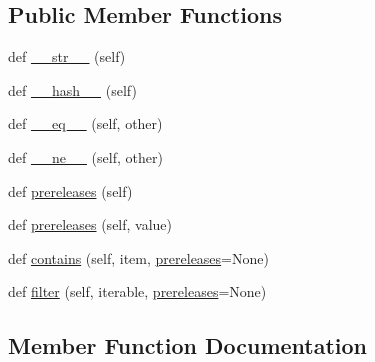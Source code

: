\subsection*{Public Member Functions}
\begin{DoxyCompactItemize}
\item 
def \hyperlink{classpkg__resources_1_1__vendor_1_1packaging_1_1specifiers_1_1_base_specifier_ad31c14d890ebbbe66fc06e8d21a24d7a}{\+\_\+\+\_\+str\+\_\+\+\_\+} (self)
\item 
def \hyperlink{classpkg__resources_1_1__vendor_1_1packaging_1_1specifiers_1_1_base_specifier_a52dc1cdce2579dda1edf9b1dde877dd0}{\+\_\+\+\_\+hash\+\_\+\+\_\+} (self)
\item 
def \hyperlink{classpkg__resources_1_1__vendor_1_1packaging_1_1specifiers_1_1_base_specifier_a03c94e7e4a4797fcb5af5a852148b128}{\+\_\+\+\_\+eq\+\_\+\+\_\+} (self, other)
\item 
def \hyperlink{classpkg__resources_1_1__vendor_1_1packaging_1_1specifiers_1_1_base_specifier_a05e2c54c1ffe67581bfed5b7b6ad42d1}{\+\_\+\+\_\+ne\+\_\+\+\_\+} (self, other)
\item 
def \hyperlink{classpkg__resources_1_1__vendor_1_1packaging_1_1specifiers_1_1_base_specifier_aa1a1ef2c6e47899e91494fde9b495162}{prereleases} (self)
\item 
def \hyperlink{classpkg__resources_1_1__vendor_1_1packaging_1_1specifiers_1_1_base_specifier_a897a6a62cda3786551aab9e0b62f7da3}{prereleases} (self, value)
\item 
def \hyperlink{classpkg__resources_1_1__vendor_1_1packaging_1_1specifiers_1_1_base_specifier_a1d2caee0c1c3f53aeea7d2b075dbf16b}{contains} (self, item, \hyperlink{classpkg__resources_1_1__vendor_1_1packaging_1_1specifiers_1_1_base_specifier_aa1a1ef2c6e47899e91494fde9b495162}{prereleases}=None)
\item 
def \hyperlink{classpkg__resources_1_1__vendor_1_1packaging_1_1specifiers_1_1_base_specifier_a140919be998ec9c1f0d70d93e43ad891}{filter} (self, iterable, \hyperlink{classpkg__resources_1_1__vendor_1_1packaging_1_1specifiers_1_1_base_specifier_aa1a1ef2c6e47899e91494fde9b495162}{prereleases}=None)
\end{DoxyCompactItemize}


\subsection{Member Function Documentation}
\mbox{\label{classpkg__resources_1_1__vendor_1_1packaging_1_1specifiers_1_1_base_specifier_a03c94e7e4a4797fcb5af5a852148b128}} 
